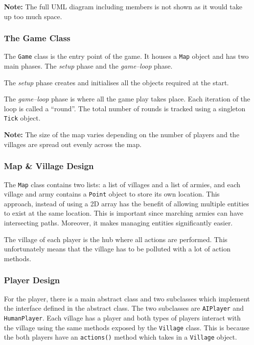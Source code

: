 \documentclass[12pt]{article}
\begin{document}
\textbf{Note:} The full UML diagram including members is not
shown as it would take up too much space.

\subsubsection{The Game Class}

The \texttt{Game} class is the entry point of the game. It
houses a \texttt{Map} object and has two main phases. The
\textit{setup} phase and the \textit{game--loop} phase.

The \textit{setup} phase creates and initialises all the objects
required at the start.

The \textit{game--loop} phase is where all the game play takes
place. Each iteration of the loop is called a ``round''. The
total number of rounds is tracked using a singleton
\texttt{Tick} object.

\textbf{Note:} The size of the map varies depending on the
number of players and the villages are spread out evenly across
the map.

\subsubsection{Map \& Village Design}

The \texttt{Map} class contains two lists: a list of villages
and a list of armies, and each village and army contains a
\texttt{Point} object to store its own location. This approach,
instead of using a 2D array has the benefit of allowing multiple
entities to exist at the same location. This is important since
marching armies can have intersecting paths. Moreover, it makes
managing entities significantly easier.

The village of each player is the hub where all actions are
performed. This unfortunately means that the village has to be
polluted with a lot of action methods.

\subsubsection{Player Design}

For the player, there is a main abstract class and two
subclasses which implement the interface defined in the abstract
class. The two subclasses are \texttt{AIPlayer} and
\texttt{HumanPlayer}. Each village has a player and both types
of players interact with the village using the same methods
exposed by the \texttt{Village} class. This is because the both
players have an \texttt{actions()} method which takes in a
\texttt{Village} object.
\end{document}

